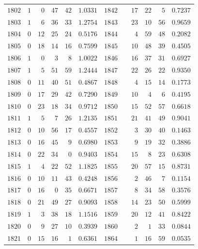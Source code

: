 \begin{center}
\begin{tabular}{r|rrrr|r||r|rrrr|r}
$1802$ & $1$ & $0$ & $47$ & $42$ & $1.0331$ & $1842$ &  & $17$ & $22$ & $5$ & $0.7237$\\
$1803$ & $1$ & $6$ & $36$ & $33$ & $1.2754$ & $1843$ &  & $23$ & $10$ & $56$ & $0.9659$\\
$1804$ & $0$ & $12$ & $25$ & $24$ & $0.5176$ & $1844$ &  & $4$ & $59$ & $48$ & $0.2082$\\
$1805$ & $0$ & $18$ & $14$ & $16$ & $0.7599$ & $1845$ &  & $10$ & $48$ & $39$ & $0.4505$\\[3pt]
$1806$ & $1$ & $0$ & $3$ & $8$ & $1.0022$ & $1846$ &  & $16$ & $37$ & $31$ & $0.6927$\\
$1807$ & $1$ & $5$ & $51$ & $59$ & $1.2444$ & $1847$ &  & $22$ & $26$ & $22$ & $0.9350$\\
$1808$ & $0$ & $11$ & $40$ & $51$ & $0.4867$ & $1848$ &  & $4$ & $15$ & $14$ & $0.1773$\\
$1809$ & $0$ & $17$ & $29$ & $42$ & $0.7290$ & $1849$ &  & $10$ & $4$ & $6$ & $0.4195$\\
$1810$ & $0$ & $23$ & $18$ & $34$ & $0.9712$ & $1850$ &  & $15$ & $52$ & $57$ & $0.6618$\\[3pt]
$1811$ & $1$ & $5$ & $7$ & $26$ & $1.2135$ & $1851$ &  & $21$ & $41$ & $49$ & $0.9041$\\
$1812$ & $0$ & $10$ & $56$ & $17$ & $0.4557$ & $1852$ &  & $3$ & $30$ & $40$ & $0.1463$\\
$1813$ & $0$ & $16$ & $45$ & $9$ & $0.6980$ & $1853$ &  & $9$ & $19$ & $32$ & $0.3886$\\
$1814$ & $0$ & $22$ & $34$ & $0$ & $0.9403$ & $1854$ &  & $15$ & $8$ & $23$ & $0.6308$\\
$1815$ & $1$ & $4$ & $22$ & $52$ & $1.1825$ & $1855$ &  & $20$ & $57$ & $15$ & $0.8731$\\[3pt]
$1816$ & $0$ & $10$ & $11$ & $43$ & $0.4248$ & $1856$ &  & $2$ & $46$ & $7$ & $0.1154$\\
$1817$ & $0$ & $16$ & $0$ & $35$ & $0.6671$ & $1857$ &  & $8$ & $34$ & $58$ & $0.3576$\\
$1818$ & $0$ & $21$ & $49$ & $27$ & $0.9093$ & $1858$ &  & $14$ & $23$ & $50$ & $0.5999$\\
$1819$ & $1$ & $3$ & $38$ & $18$ & $1.1516$ & $1859$ &  & $20$ & $12$ & $41$ & $0.8422$\\
$1820$ & $0$ & $9$ & $27$ & $10$ & $0.3939$ & $1860$ &  & $2$ & $1$ & $33$ & $0.0844$\\[3pt]
$1821$ & $0$ & $15$ & $16$ & $1$ & $0.6361$ & $1864$ &  & $1$ & $16$ & $59$ & $0.0535$\\

\end{tabular}
\end{center}
